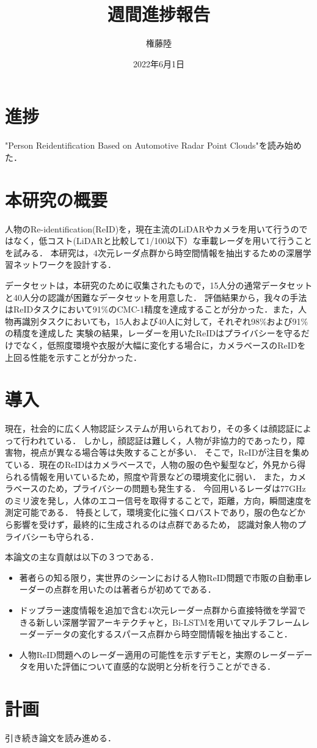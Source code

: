 \documentclass[dvipdfmx]{jsarticle}
\begin{document}
\title{週間進捗報告}
\author{権藤陸}
\date{2022年6月1日}
\maketitle
\section{進捗}
"Person Reidentification Based on Automotive Radar Point Clouds"を読み始めた．
\section{本研究の概要}
人物のRe-identification(ReID)を，現在主流のLiDARやカメラを用いて行うのではなく，低コスト(LiDARと比較して1/100以下）な車載レーダを用いて行うことを試みる．
本研究は，4次元レーダ点群から時空間情報を抽出するための深層学習ネットワークを設計する．

データセットは，本研究のために収集されたもので，15人分の通常データセットと40人分の認識が困難なデータセットを用意した．
評価結果から，我々の手法はReIDタスクにおいて91\%のCMC-1精度を達成することが分かった．また，人物再識別タスクにおいても，15人および40人に対して，それぞれ98\%および91\%の精度を達成した
実験の結果，レーダーを用いたReIDはプライバシーを守るだけでなく，低照度環境や衣服が大幅に変化する場合に，カメラベースのReIDを上回る性能を示すことが分かった．
\section{導入}
現在，社会的に広く人物認証システムが用いられており，その多くは顔認証によって行われている．
しかし，顔認証は難しく，人物が非協力的であったり，障害物，視点が異なる場合等は失敗することが多い．
そこで，ReIDが注目を集めている．現在のReIDはカメラベースで，人物の服の色や髪型など，外見から得られる情報を用いているため，照度や背景などの環境変化に弱い．
また，カメラベースのため，プライバシーの問題も発生する．
今回用いるレーダは77GHzのミリ波を発し，人体のエコー信号を取得することで，距離，方向，瞬間速度を測定可能である．
特長として，環境変化に強くロバストであり，服の色などから影響を受けず，最終的に生成されるのは点群であるため，
認識対象人物のプライバシーも守られる．

本論文の主な貢献は以下の３つである．
\begin{itemize}
	\item 著者らの知る限り，実世界のシーンにおける人物ReID問題で市販の自動車レーダーの点群を用いたのは著者らが初めてである．
	\item ドップラー速度情報を追加で含む4次元レーダー点群から直接特徴を学習できる新しい深層学習アーキテクチャと，Bi-LSTMを用いてマルチフレームレーダーデータの変化するスパース点群から時空間情報を抽出すること．
	\item 人物ReID問題へのレーダー適用の可能性を示すデモと，実際のレーダーデータを用いた評価について直感的な説明と分析を行うことができる．
\end{itemize}
\section{計画}
引き続き論文を読み進める．
\end{document}
